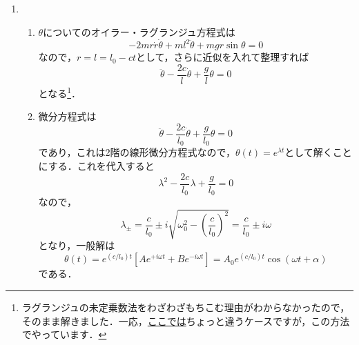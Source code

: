 \documentclass[a4paper,pdflatex,ja=standard]{bxjsarticle}
\begin{document}
\begin{enumerate}
  \item 
  \begin{enumerate}
    \item 
    $\theta$についてのオイラー・ラグランジュ方程式は
    \begin{equation}
      -2mr\dot{r}\dot{\theta}
      +
      ml^2\ddot{\theta}
      +
      mgr\sin\theta
      =
      0
    \end{equation}
    なので，$r=l=l_{0}-ct$として，さらに近似を入れて整理すれば
    \begin{equation}
      \ddot{\theta}
      -
      \frac{2c}{l}\dot{\theta}
      +
      \frac{g}{l}\theta
      =
      0
    \end{equation}
    となる\footnote{
      ラグランジュの未定乗数法をわざわざもちこむ理由がわからなかったので，そのまま解きました．一応，\href{https://dora.bk.tsukuba.ac.jp/~takeuchi/?\%E8\%A7\%A3\%E6\%9E\%90\%E5\%8A\%9B\%E5\%AD\%A6\%2F\%E3\%83\%A9\%E3\%82\%B0\%E3\%83\%A9\%E3\%83\%B3\%E3\%82\%B8\%E3\%83\%A5\%E5\%8A\%9B\%E5\%AD\%A6\%E3\%81\%A8\%E6\%9C\%AA\%E5\%AE\%9A\%E4\%BF\%82\%E6\%95\%B0\%E6\%B3\%95}{ここでは}ちょっと違うケースですが，この方法でやっています．
    }．

    \item 
    微分方程式は
    \begin{equation}
      \ddot{\theta}
      -
      \frac{2c}{l_{0}}\dot{\theta}
      +
      \frac{g}{l_{0}}\theta
      =
      0
    \end{equation}
    であり，これは2階の線形微分方程式なので，$\theta(t)=e^{\lambda t}$として解くことにする．これを代入すると
    \begin{equation}
      \lambda^2
      -
      \frac{2c}{l_{0}}\lambda
      +
      \frac{g}{l_{0}}
      =
      0
    \end{equation}
    なので，
    \begin{equation}
      \lambda_{\pm}
      =
      \frac{c}{l_{0}}
      \pm
      i
      \sqrt{\omega_{0}^2-\left( \frac{c}{l_{0}} \right)^2}
      =
      \frac{c}{l_{0}}
      \pm
      i\omega
    \end{equation}
    となり，一般解は
    \begin{equation}
      \theta(t)
      =
      e^{(c/l_{0})t}
      \left[  
        Ae^{+i\omega t}
        +
        Be^{-i\omega t}
      \right]
      =
      A_{0}e^{(c/l_{0})t}
      \cos(\omega t+\alpha)
    \end{equation}
    である．

  \end{enumerate}


\end{enumerate}
\end{document}
